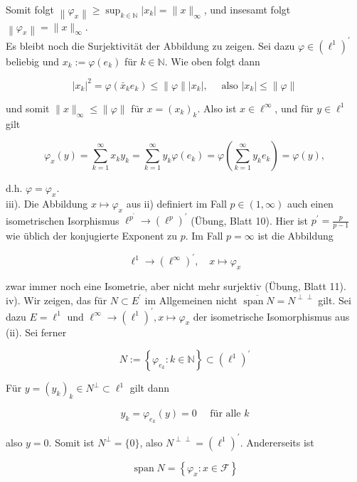 \documentclass[10pt, letterpaper]{article}
\begin{document}
Somit folgt $\left\|\varphi_{x}\right\| \geq \sup _{k \in \mathbb{N}}\left|x_{k}\right|=\|x\|_{\infty}$, und insesamt folgt $\left\|\varphi_{x}\right\|=\|x\|_{\infty}$.\\
Es bleibt noch die Surjektivität der Abbildung zu zeigen. Sei dazu $\varphi \in\left(\ell^{1}\right)^{\prime}$ beliebig und $x_{k}:=\varphi\left(e_{k}\right)$ für $k \in \mathbb{N}$. Wie oben folgt dann

$$
\left|x_{k}\right|^{2}=\varphi\left(\bar{x}_{k} e_{k}\right) \leq\|\varphi\|\left|x_{k}\right|, \quad \text { also }\left|x_{k}\right| \leq\|\varphi\|
$$

und somit $\|x\|_{\infty} \leq\|\varphi\|$ für $x=\left(x_{k}\right)_{k}$. Also ist $x \in \ell^{\infty}$, und für $y \in \ell^{1}$ gilt

$$
\varphi_{x}(y)=\sum_{k=1}^{\infty} x_{k} y_{k}=\sum_{k=1}^{\infty} y_{k} \varphi\left(e_{k}\right)=\varphi\left(\sum_{k=1}^{\infty} y_{k} e_{k}\right)=\varphi(y),
$$

d.h. $\varphi=\varphi_{x}$.\\
iii). Die Abbildung $x \mapsto \varphi_{x}$ aus ii) definiert im Fall $p \in(1, \infty)$ auch einen isometrischen Isorphismus $\ell^{p^{\prime}} \rightarrow\left(\ell^{p}\right)^{\prime}$ (Übung, Blatt 10). Hier ist $p^{\prime}=\frac{p}{p-1}$ wie üblich der konjugierte Exponent zu $p$. Im Fall $p=\infty$ ist die Abbildung

$$
\ell^{1} \rightarrow\left(\ell^{\infty}\right)^{\prime}, \quad x \mapsto \varphi_{x}
$$

zwar immer noch eine Isometrie, aber nicht mehr surjektiv (Übung, Blatt 11).\\
iv). Wir zeigen, das für $N \subset E^{\prime}$ im Allgemeinen nicht $\overline{\operatorname{span} N}=N^{\perp \perp}$ gilt. Sei dazu $E=\ell^{1}$ und $\ell^{\infty} \rightarrow\left(\ell^{1}\right)^{\prime}, x \mapsto \varphi_{x}$ der isometrische Isomorphismus aus (ii). Sei ferner

$$
N:=\left\{\varphi_{e_{k}}: k \in \mathbb{N}\right\} \subset\left(\ell^{1}\right)^{\prime}
$$

Für $y=\left(y_{k}\right)_{k} \in N^{\perp} \subset \ell^{1}$ gilt dann

$$
y_{k}=\varphi_{e_{k}}(y)=0 \quad \text { für alle } k
$$

also $y=0$. Somit ist $N^{\perp}=\{0\}$, also $N^{\perp \perp}=\left(\ell^{1}\right)^{\prime}$. Andererseits ist

$$
\operatorname{span} N=\left\{\varphi_{x}: x \in \mathcal{F}\right\}
$$
\end{document}
